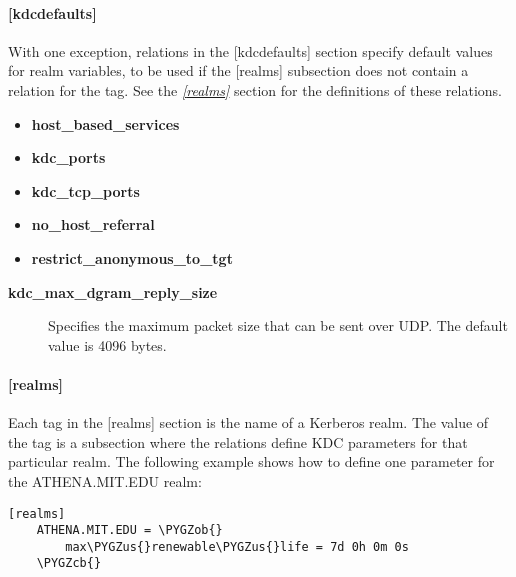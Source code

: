 \documentclass[letterpaper,10pt,english]{sphinxmanual}
\def\PYGZus{\char`\_}
\def\PYGZob{\char`\{}
\def\PYGZcb{\char`\}}
\begin{document}
\paragraph{{[}kdcdefaults{]}}
\label{admin/conf_files/kdc_conf:kdcdefaults}\label{admin/conf_files/kdc_conf:id1}
With one exception, relations in the {[}kdcdefaults{]} section specify
default values for realm variables, to be used if the {[}realms{]}
subsection does not contain a relation for the tag.  See the
{\hyperref[admin/conf_files/kdc_conf:kdc-realms]{\emph{{[}realms{]}}}} section for the definitions of these relations.
\begin{itemize}
\item {} 
\textbf{host\_based\_services}

\item {} 
\textbf{kdc\_ports}

\item {} 
\textbf{kdc\_tcp\_ports}

\item {} 
\textbf{no\_host\_referral}

\item {} 
\textbf{restrict\_anonymous\_to\_tgt}

\end{itemize}
\begin{description}
\item[{\textbf{kdc\_max\_dgram\_reply\_size}}] \leavevmode
Specifies the maximum packet size that can be sent over UDP.  The
default value is 4096 bytes.

\end{description}


\paragraph{{[}realms{]}}
\label{admin/conf_files/kdc_conf:realms}\label{admin/conf_files/kdc_conf:kdc-realms}
Each tag in the {[}realms{]} section is the name of a Kerberos realm.  The
value of the tag is a subsection where the relations define KDC
parameters for that particular realm.  The following example shows how
to define one parameter for the ATHENA.MIT.EDU realm:

\begin{Verbatim}[commandchars=\\\{\}]
[realms]
    ATHENA.MIT.EDU = \PYGZob{}
        max\PYGZus{}renewable\PYGZus{}life = 7d 0h 0m 0s
    \PYGZcb{}
\end{Verbatim}
\end{document}
